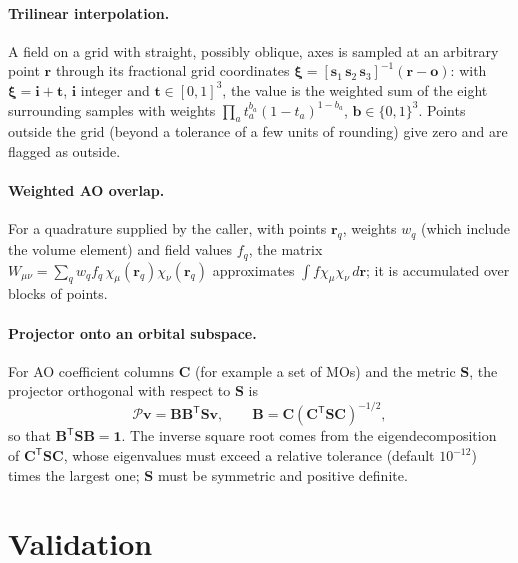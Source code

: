 \documentclass[11pt,a4paper]{article}
\begin{document}
\paragraph{Trilinear interpolation.} A field on a grid with straight,
possibly oblique, axes is sampled at an arbitrary point $\mathbf r$ through
its fractional grid coordinates
$\boldsymbol\xi=[\mathbf s_1\,\mathbf s_2\,\mathbf s_3]^{-1}(\mathbf r-\mathbf o)$:
with $\boldsymbol\xi=\mathbf i+\mathbf t$, $\mathbf i$ integer and
$\mathbf t\in[0,1]^3$, the value is the weighted sum of the eight
surrounding samples with weights $\prod_a t_a^{b_a}(1-t_a)^{1-b_a}$,
$\mathbf b\in\{0,1\}^3$. Points outside the grid (beyond a tolerance of a
few units of rounding) give zero and are flagged as outside.

\paragraph{Weighted AO overlap.} For a quadrature supplied by the caller,
with points $\mathbf r_q$, weights $w_q$ (which include the volume element)
and field values $f_q$, the matrix
$W_{\mu\nu}=\sum_qw_qf_q\,\chi_\mu(\mathbf r_q)\chi_\nu(\mathbf r_q)$
approximates $\int f\chi_\mu\chi_\nu\,d\mathbf r$; it is accumulated over
blocks of points.

\paragraph{Projector onto an orbital subspace.} For AO coefficient columns
$\mathbf C$ (for example a set of MOs) and the metric $\mathbf S$, the
projector orthogonal with respect to $\mathbf S$ is
\begin{equation}
 \mathcal P\mathbf v=\mathbf B\mathbf B^{\mathsf T}\mathbf S\mathbf v,\qquad
 \mathbf B=\mathbf C(\mathbf C^{\mathsf T}\mathbf S\mathbf C)^{-1/2},
\end{equation}
so that $\mathbf B^{\mathsf T}\mathbf S\mathbf B=\mathbf 1$. The inverse
square root comes from the eigendecomposition of
$\mathbf C^{\mathsf T}\mathbf S\mathbf C$, whose eigenvalues must exceed a
relative tolerance (default $10^{-12}$) times the largest one; $\mathbf S$
must be symmetric and positive definite.

\section{Validation}\label{sec:validation}
\end{document}
